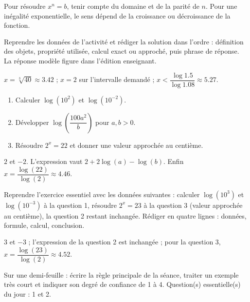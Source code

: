 \begin{summary}Pour résoudre $x^n=b$, tenir compte du domaine et de la parité de $n$. Pour une inégalité exponentielle, le sens dépend de la croissance ou décroissance de la fonction.\end{summary}

\begin{example}
Reprendre les données de l'activité et rédiger la solution dans l'ordre : définition des objets, propriété utilisée, calcul exact ou approché, puis phrase de réponse. La réponse modèle figure dans l'édition enseignant.
\end{example}
\begin{solution}$x=\sqrt[3]{40}\approx\num{3,42}$ ; $x=2$ sur l'intervalle demandé ; $x<\dfrac{\log\num{1,5}}{\log\num{1,08}}\approx\num{5,27}$.\end{solution}

\begin{exercise}[essentiel]
\begin{enumerate}\item Calculer $\log(10^2)$ et $\log(10^{-2})$.\item Développer $\log\!\left(\dfrac{100a^2}{b}\right)$ pour $a,b>0$.\item Résoudre $2^x=22$ et donner une valeur approchée au centième.\end{enumerate}
\end{exercise}
\begin{solution}$2$ et $-2$. L'expression vaut $2+2\log(a)-\log(b)$. Enfin $x=\dfrac{\log(22)}{\log(2)}\approx\num{4,46}$.\end{solution}


\begin{homework}Reprendre l'exercice essentiel avec les données suivantes : calculer $\log(10^{3})$ et $\log(10^{-3})$ à la question 1, résoudre $2^x=23$ à la question 3 (valeur approchée au centième), la question 2 restant inchangée. Rédiger en quatre lignes : données, formule, calcul, conclusion.\end{homework}
\begin{solution}$3$ et $-3$ ; l'expression de la question 2 est inchangée ; pour la question 3, $x=\dfrac{\log(23)}{\log(2)}\approx\num{4,52}$.\end{solution}

\begin{exitticket}[3 minutes]Sur une demi-feuille : écrire la règle principale de la séance, traiter un exemple très court et indiquer son degré de confiance de 1 à 4. Question(s) essentielle(s) du jour : 1 et 2.\end{exitticket}

